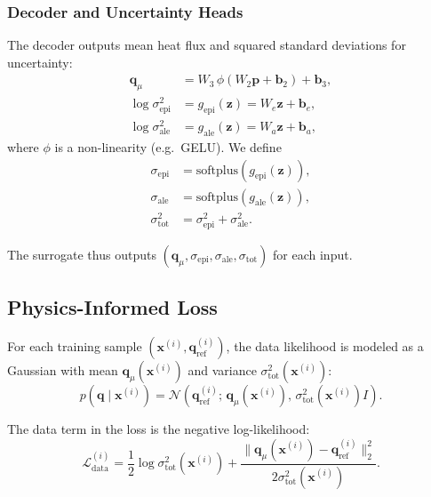 \documentclass[11pt]{article}
\begin{document}
\subsubsection{Decoder and Uncertainty Heads}

The decoder outputs mean heat flux and squared standard deviations for uncertainty:
\begin{align}
  \bm{q}_\mu &= W_3 \,\phi\!\left(W_2 \bm{p} + \bm{b}_2\right) + \bm{b}_3, \\
  \log \sigma_{\mathrm{epi}}^2 &= g_\mathrm{epi}(\bm{z}) = W_e \bm{z} + \bm{b}_e, \\
  \log \sigma_{\mathrm{ale}}^2 &= g_\mathrm{ale}(\bm{z}) = W_a \bm{z} + \bm{b}_a,
\end{align}
where $\phi$ is a non-linearity (e.g.\ GELU). We define
\begin{align}
  \sigma_{\mathrm{epi}} &= \mathrm{softplus}\left( g_\mathrm{epi}(\bm{z}) \right), \\
  \sigma_{\mathrm{ale}} &= \mathrm{softplus}\left( g_\mathrm{ale}(\bm{z}) \right), \\
  \sigma_{\mathrm{tot}}^2 &= \sigma_{\mathrm{epi}}^2 + \sigma_{\mathrm{ale}}^2.
\end{align}

The surrogate thus outputs $(\bm{q}_\mu, \sigma_{\mathrm{epi}}, \sigma_{\mathrm{ale}}, \sigma_{\mathrm{tot}})$ for each input.

\subsection{Physics-Informed Loss}

For each training sample $(\bm{x}^{(i)}, \bm{q}^{(i)}_\mathrm{ref})$, the data likelihood is modeled as a Gaussian with mean $\bm{q}_\mu(\bm{x}^{(i)})$ and variance $\sigma_{\mathrm{tot}}^2(\bm{x}^{(i)})$:
\begin{equation}
  p(\bm{q} \mid \bm{x}^{(i)}) = \mathcal{N}\left(\bm{q}^{(i)}_\mathrm{ref};\, \bm{q}_\mu(\bm{x}^{(i)}),\, \sigma_{\mathrm{tot}}^2(\bm{x}^{(i)}) I \right).
\end{equation}

The data term in the loss is the negative log-likelihood:
\begin{equation}
  \mathcal{L}_\mathrm{data}^{(i)} = \frac{1}{2} \log \sigma_{\mathrm{tot}}^2(\bm{x}^{(i)}) + \frac{\big\|\bm{q}_\mu(\bm{x}^{(i)}) - \bm{q}^{(i)}_\mathrm{ref}\big\|_2^2}{2 \sigma_{\mathrm{tot}}^2(\bm{x}^{(i)})}.
\end{equation}
\end{document}
